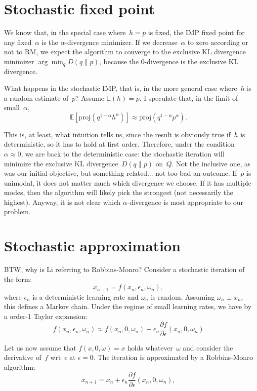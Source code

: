 \documentclass{article}
\begin{document}
\section{Stochastic fixed point}

We know that, in the special case where~$h=p$ is fixed, the IMP fixed point for any fixed~$\alpha$ is the $\alpha$-divergence minimizer. If we decrease~$\alpha$ to zero according or not to RM, we expect the algorithm to converge to the exclusive KL divergence minimizer $\arg\min_q D(q\|p)$, because the 0-divergence is the exclusive KL divergence.

What happens in the stochastic IMP, that is, in the more general case where~$h$ is a random estimate of~$p$? Assume $\mathbb{E}(h)=p$. I speculate that, in the limit of small~$\alpha$,
$$
\mathbb{E}[\text{proj}(q^{1-\alpha}h^\alpha)]
\approx \text{proj}(q^{1-\alpha}p^\alpha).
$$

This is, at least, what intuition tells us, since the result is obviously true if~$h$ is deterministic, so it has to hold at first order. Therefore, under the condition $\alpha\approx 0$, we are back to the deterministic case: the stochastic iteration will minimize the exclusive KL divergence~$D(q\|p)$ on~$Q$. Not the inclusive one, as was our initial objective, but something related... not too bad an outcome. If~$p$ is unimodal, it does not matter much which divergence we choose. If it has multiple modes, then the algorithm will likely pick the strongest (not necessarily the highest). Anyway, it is not clear which $\alpha$-divergence is most appropriate to our problem. 



\section{Stochastic approximation}

BTW, why is Li referring to Robbins-Monro? Consider a stochastic iteration of the form: $$
x_{n+1} = f(x_n, \epsilon_n, \omega_n),
$$
where $\epsilon_n$ is a deterministic learning rate and $\omega_n$ is random. Assuming $\omega_n\perp x_n$, this defines a Markov chain. Under the regime of small learning rates, we have by a order-1 Taylor expansion:
$$
f(x_n, \epsilon_n, \omega_n) 
\approx f(x_n, 0, \omega_n) + \epsilon_n \frac{\partial f}{\partial \epsilon} (x_n, 0,\omega_n)
$$

Let us now assume that $f(x, 0, \omega)=x$ holds whatever~$\omega$ and consider the derivative of~$f$ wrt~$\epsilon$ at $\epsilon=0$. The iteration is approximated by a Robbins-Monro algorithm:
$$
x_{n+1} = x_n + \epsilon_n \frac{\partial f}{\partial \epsilon}(x_n,0,\omega_n),
$$
\end{document}
